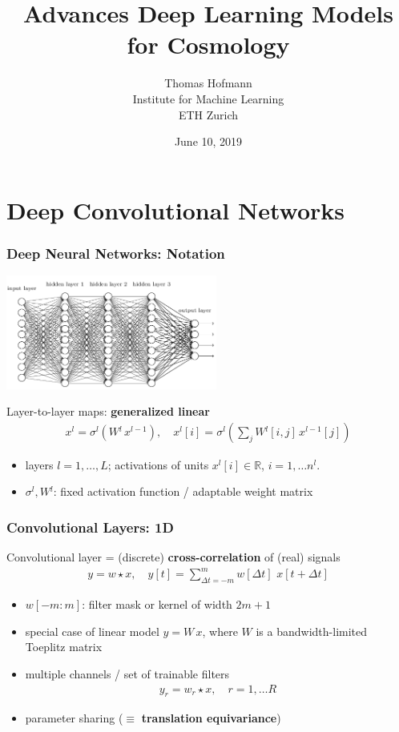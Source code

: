 \documentclass[compress]{beamer}
\author{
   		Thomas Hofmann \\[5mm] 
		Institute for Machine Learning \\ ETH Zurich
	}
\title{
		Advances Deep Learning Models for Cosmology
	}
\date{
		June 10, 2019
	}
\newcommand{\x}{{x}}
\newcommand{\y}{{y}}
\newcommand{\w}{{w}}
\newcommand{\W}{{W}}
\renewcommand{\l}{{^l}}
\newcommand{\lminus}{{^{l-1}}}
\newcommand{\textbblue}[1]{{\bf\color{Blue} #1}}
\newcommand{\is}[1]{\setlength{\itemsep}{#1}}
\renewcommand{\Re}{{\mathbb R}}
\begin{document}
\frame[plain]{\titlepage}

\section{Deep Convolutional Networks}
\frame{\sectionpage}


\begin{frame} \frametitle{Deep Neural Networks: Notation}
\begin{center}
\includegraphics[width=0.52\textwidth]{./figures/OH3gI.png}
\end{center}

Layer-to-layer maps: \textbblue{generalized linear }
\begin{align*}
\x\l = \sigma\l \left( \W\l \, \x\lminus \right), \quad \x\l[i] = \sigma\l\left(\sum_{j} \W\l[i,j]\, x\lminus[j]\right)
\end{align*}
\vspace*{-5mm}
\begin{itemize}
\item layers $l=1,\dots,L$; activations of units $x\l[i] \in \Re$, $i=1,\dots n\l$.\\[2mm]
\item $\sigma\l, \W\l$: fixed activation function / adaptable weight matrix
\end{itemize}
\end{frame}

\begin{frame} \frametitle{Convolutional Layers: 1D}

Convolutional layer = (discrete) \textbblue{cross-correlation} of (real) signals 
\begin{align*}
y= \w \star \x, \quad   y[t] = \sum_{\Delta t=-m}^m w[\Delta t] \,\, x[t+\Delta t]
\end{align*}
\vspace*{-2mm}
\begin{itemize} \is{2mm}
\item $w[-m\!:\!m]$: filter mask or kernel of width $2m+1$
\item special case of linear model $\y = \W \,\x$, where $\W$ is a bandwidth-limited Toeplitz matrix
\item multiple channels / set of trainable filters
\begin{align*}
\y_r  = \w_r \star \x, \quad r=1,\dots R
\end{align*}
\item parameter sharing ($\equiv$ \textbblue{translation equivariance})
\end{itemize}
\end{frame}
\end{document}

